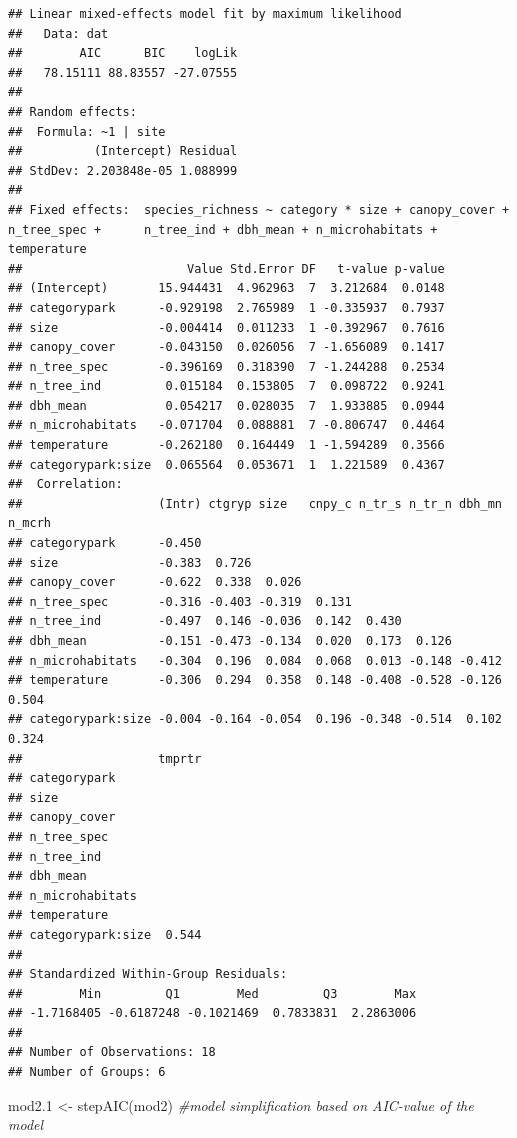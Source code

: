 \documentclass[
]{article}
\newenvironment{Shaded}{\begin{snugshade}}{\end{snugshade}}
\newcommand{\CommentTok}[1]{\textcolor[rgb]{0.56,0.35,0.01}{\textit{#1}}}
\newcommand{\FloatTok}[1]{\textcolor[rgb]{0.00,0.00,0.81}{#1}}
\newcommand{\FunctionTok}[1]{\textcolor[rgb]{0.00,0.00,0.00}{#1}}
\newcommand{\NormalTok}[1]{#1}
\newcommand{\OtherTok}[1]{\textcolor[rgb]{0.56,0.35,0.01}{#1}}
\begin{document}
\begin{verbatim}
## Linear mixed-effects model fit by maximum likelihood
##   Data: dat 
##        AIC      BIC    logLik
##   78.15111 88.83557 -27.07555
## 
## Random effects:
##  Formula: ~1 | site
##          (Intercept) Residual
## StdDev: 2.203848e-05 1.088999
## 
## Fixed effects:  species_richness ~ category * size + canopy_cover + n_tree_spec +      n_tree_ind + dbh_mean + n_microhabitats + temperature 
##                       Value Std.Error DF   t-value p-value
## (Intercept)       15.944431  4.962963  7  3.212684  0.0148
## categorypark      -0.929198  2.765989  1 -0.335937  0.7937
## size              -0.004414  0.011233  1 -0.392967  0.7616
## canopy_cover      -0.043150  0.026056  7 -1.656089  0.1417
## n_tree_spec       -0.396169  0.318390  7 -1.244288  0.2534
## n_tree_ind         0.015184  0.153805  7  0.098722  0.9241
## dbh_mean           0.054217  0.028035  7  1.933885  0.0944
## n_microhabitats   -0.071704  0.088881  7 -0.806747  0.4464
## temperature       -0.262180  0.164449  1 -1.594289  0.3566
## categorypark:size  0.065564  0.053671  1  1.221589  0.4367
##  Correlation: 
##                   (Intr) ctgryp size   cnpy_c n_tr_s n_tr_n dbh_mn n_mcrh
## categorypark      -0.450                                                 
## size              -0.383  0.726                                          
## canopy_cover      -0.622  0.338  0.026                                   
## n_tree_spec       -0.316 -0.403 -0.319  0.131                            
## n_tree_ind        -0.497  0.146 -0.036  0.142  0.430                     
## dbh_mean          -0.151 -0.473 -0.134  0.020  0.173  0.126              
## n_microhabitats   -0.304  0.196  0.084  0.068  0.013 -0.148 -0.412       
## temperature       -0.306  0.294  0.358  0.148 -0.408 -0.528 -0.126  0.504
## categorypark:size -0.004 -0.164 -0.054  0.196 -0.348 -0.514  0.102  0.324
##                   tmprtr
## categorypark            
## size                    
## canopy_cover            
## n_tree_spec             
## n_tree_ind              
## dbh_mean                
## n_microhabitats         
## temperature             
## categorypark:size  0.544
## 
## Standardized Within-Group Residuals:
##        Min         Q1        Med         Q3        Max 
## -1.7168405 -0.6187248 -0.1021469  0.7833831  2.2863006 
## 
## Number of Observations: 18
## Number of Groups: 6
\end{verbatim}

\begin{Shaded}
\begin{Highlighting}[]
\NormalTok{mod2}\FloatTok{.1} \OtherTok{\textless{}{-}} \FunctionTok{stepAIC}\NormalTok{(mod2) }\CommentTok{\#model simplification based on AIC{-}value of the model}
\end{Highlighting}
\end{Shaded}
\end{document}
